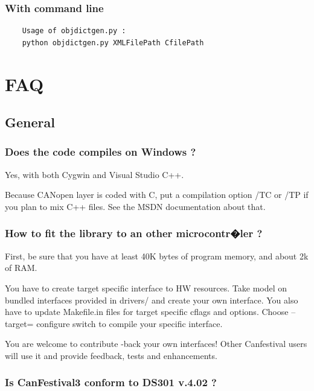 \documentclass[12pt,english,a4paper]{book}
\newcommand{\canopen}{CANopen }
\begin{document}
\subsubsection{With command line}

\begin{verbatim}
	Usage of objdictgen.py :
	python objdictgen.py XMLFilePath CfilePath
\end{verbatim}



\section{FAQ}


\subsection{General}


\subsubsection{Does the code compiles on Windows ?}

Yes, with both Cygwin and Visual Studio C++. 

Because \canopen layer is coded with C, put a compilation option
/TC or /TP if you plan to mix C++ files. See the MSDN documentation
about that.


\subsubsection{How to fit the library to an other microcontr�ler ?}

First, be sure that you have at least 40K bytes of program memory,
and about 2k of RAM.

You have to create target specific interface to HW resources. Take
model on bundled interfaces provided in drivers/ and create your own
interface. You also have to update Makefile.in files for target specific
cflags and options. Choose {--}target= configure switch to compile
your specific interface.

You are welcome to contribute -back your own interfaces! Other Canfestival
users will use it and provide feedback, tests and enhancements.


\subsubsection{Is CanFestival3 conform to DS301 v.4.02 ?}
\end{document}
